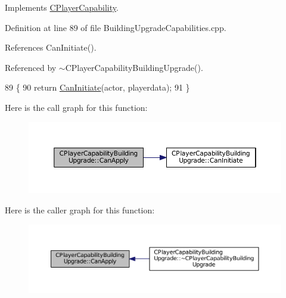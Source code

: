 Implements \hyperlink{classCPlayerCapability_ae96263e0950f496492f8baeb877b9554}{C\+Player\+Capability}.



Definition at line 89 of file Building\+Upgrade\+Capabilities.\+cpp.



References Can\+Initiate().



Referenced by $\sim$\+C\+Player\+Capability\+Building\+Upgrade().


\begin{DoxyCode}
89                                                                                                            
                                                            \{
90     \textcolor{keywordflow}{return} \hyperlink{classCPlayerCapabilityBuildingUpgrade_af515cec6f1a28607864c853307e17d7c}{CanInitiate}(actor, playerdata);
91 \}
\end{DoxyCode}
Here is the call graph for this function\+:\nopagebreak
\begin{figure}[H]
\begin{center}
\leavevmode
\includegraphics[width=350pt]{classCPlayerCapabilityBuildingUpgrade_a22de7902bcf6406a3b3a7c51e5c56f35_cgraph}
\end{center}
\end{figure}
Here is the caller graph for this function\+:\nopagebreak
\begin{figure}[H]
\begin{center}
\leavevmode
\includegraphics[width=350pt]{classCPlayerCapabilityBuildingUpgrade_a22de7902bcf6406a3b3a7c51e5c56f35_icgraph}
\end{center}
\end{figure}
\hypertarget{classCPlayerCapabilityBuildingUpgrade_af515cec6f1a28607864c853307e17d7c}{}\label{classCPlayerCapabilityBuildingUpgrade_af515cec6f1a28607864c853307e17d7c} 
